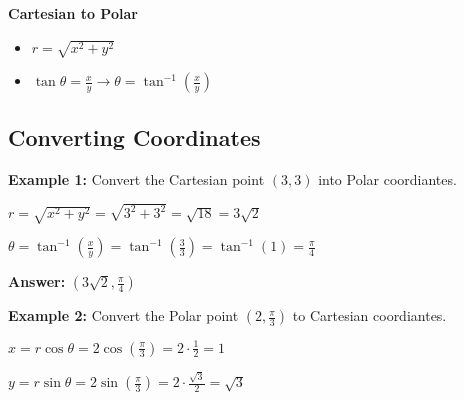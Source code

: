 \documentclass[10pt]{article}                               %
\begin{document}
\begin{adjustwidth}{2em}{0pt}
\begin{adjustwidth}{2em}{0pt}
        \vspace{0.5em}

        \textbf{Cartesian to Polar}

        \begin{itemize}
            \item \( r = \sqrt{x^2 + y^2} \)
            \item \( \tan\theta = \frac{x}{y}  \rightarrow  \theta = \tan^{-1}\left(\frac{x}{y}\right) \)
        \end{itemize}

        \vspace{0.5em}


        \begin{examplebox}

            \subsection*{Converting Coordinates}

            \textbf{Example 1:} Convert the Cartesian point \( \left(3,3\right) \) into Polar coordiantes.
            \vspace{0.5em}

            \begin{adjustwidth}{2em}{0pt}

                \( r = \sqrt{x^2 + y^2} = \sqrt{3^2 + 3^2} = \sqrt{18} = 3\sqrt{2} \)

                \( \theta = \tan^{-1}\left(\frac{x}{y}\right) = \tan^{-1}\left(\frac{3}{3}\right) = \tan^{-1}(1) = \frac{\pi}{4} \)

                \textbf{Answer:} \( \left(3\sqrt{2}, \frac{\pi}{4}\right) \)

            \end{adjustwidth}

            \vspace{1em}

            \textbf{Example 2:} Convert the Polar point \( \left(2, \frac{\pi}{3}\right) \) to Cartesian coordiantes.
            \vspace{0.5em}

            \begin{adjustwidth}{2em}{0pt}

                \( x = r\cos\theta = 2\cos\left(\frac{\pi}{3}\right) = 2 \cdot \frac{1}{2} = 1 \)

                \( y = r\sin\theta = 2\sin\left(\frac{\pi}{3}\right) = 2 \cdot \frac{\sqrt{3}}{2} = \sqrt{3} \)


\end{adjustwidth}
\end{examplebox}
\end{adjustwidth}
\end{adjustwidth}
\end{document}
